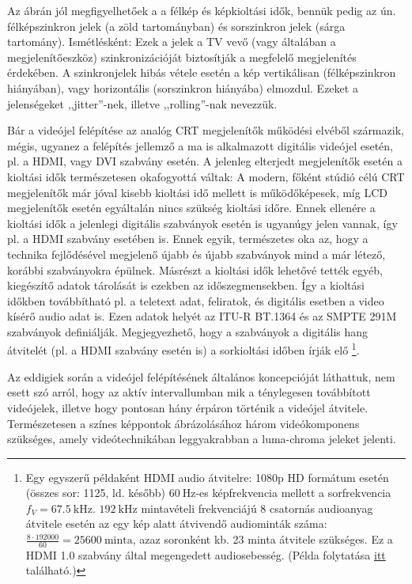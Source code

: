 Az ábrán jól megfigyelhetőek a a félkép és képkioltási idők, bennük pedig az ún. félképszinkron jelek (a zöld tartományban) és sorszinkron jelek (sárga tartomány).
Ismétlésként: Ezek a jelek a TV vevő (vagy általában a megjelenítőeszköz) szinkronizációját biztosítják a megfelelő megjelenítés érdekében.
A szinkronjelek hibás vétele esetén a kép vertikálisan (félképszinkron hiányában), vagy horizontális (sorszinkron hiányába) elmozdul.
Ezeket a jelenségeket ,,jitter''-nek, illetve ,,rolling''-nak nevezzük.

Bár a videójel felépítése az analóg CRT megjelenítők működési elvéből származik, mégis, ugyanez a felépítés jellemző a ma is alkalmazott digitális videójel esetén, pl. a HDMI, vagy DVI szabvány esetén.
A jelenleg elterjedt megjelenítők esetén a kioltási idők természetesen okafogyottá váltak:
A modern, főként stúdió célú CRT megjelenítők már jóval kisebb kioltási idő mellett is működőképesek, míg LCD megjelenítők esetén egyáltalán nincs szükség kioltási időre.
Ennek ellenére a kioltási idők a jelenlegi digitális szabványok esetén is ugyanúgy jelen vannak, így pl. a HDMI szabvány esetében is.
Ennek egyik, természetes oka az, hogy a technika fejlődésével megjelenő újabb és újabb szabványok mind a már létező, korábbi szabványokra épülnek.
Másrészt a kioltási idők lehetővé tették egyéb, kiegészítő adatok tárolását is ezekben az időszegmensekben.
Így a kioltási időkben továbbítható pl. a teletext adat, feliratok, és digitális esetben a video kísérő audio adat is.
Ezen adatok helyét az ITU-R BT.1364 és az SMPTE 291M szabványok definiálják. 
Megjegyezhető, hogy a szabványok a digitális hang átvitelét (pl. a HDMI szabvány esetén is) a sorkioltási időben írják elő \footnote{
Egy egyszerű példaként HDMI audio átvitelre:
1080p HD formátum esetén (összes sor: 1125, ld. később) $60~\mathrm{Hz}$-es képfrekvencia mellett a sorfrekvencia $f_V = 67.5~\mathrm{kHz}$.
$192~\mathrm{kHz}$ mintavételi frekvenciájú 8 csatornás audioanyag átvitele esetén az egy kép alatt átvivendő audiominták száma: $\frac{8 \cdot 192 000 }{60} = 25600~\mathrm{minta}$, azaz soronként kb. 23 minta átvitele szükséges.
Ez a HDMI 1.0 szabvány által megengedett audiosebesség. (Példa folytatása \href{https://www.sciencedirect.com/science/article/pii/B9780128016305000049}{itt} található.)
}.


\vspace{3mm}
Az eddigiek során a videójel felépítésének általános koncepcióját láthattuk, nem esett szó arról, hogy az aktív intervallumban mik a ténylegesen továbbított videójelek, illetve hogy pontosan hány érpáron történik a videójel átvitele.
Természetesen a színes képpontok ábrázolásához három videókomponens szükséges, amely videótechnikában leggyakrabban a luma-chroma jeleket jelenti.

